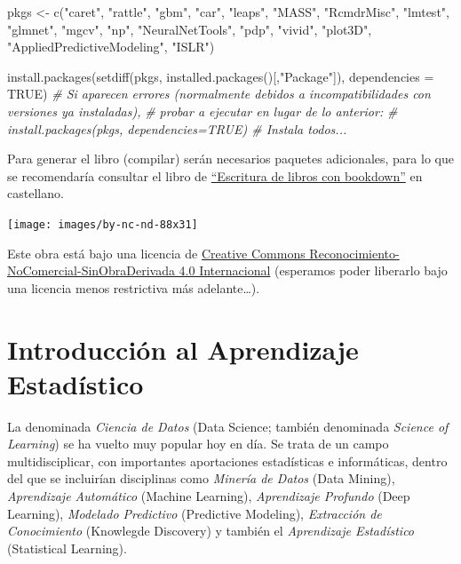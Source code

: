 \documentclass[
  spanish,
]{book}
\newenvironment{Shaded}{\begin{snugshade}}{\end{snugshade}}
\newcommand{\AttributeTok}[1]{\textcolor[rgb]{0.77,0.63,0.00}{#1}}
\newcommand{\CommentTok}[1]{\textcolor[rgb]{0.56,0.35,0.01}{\textit{#1}}}
\newcommand{\ConstantTok}[1]{\textcolor[rgb]{0.00,0.00,0.00}{#1}}
\newcommand{\FunctionTok}[1]{\textcolor[rgb]{0.00,0.00,0.00}{#1}}
\newcommand{\NormalTok}[1]{#1}
\newcommand{\OtherTok}[1]{\textcolor[rgb]{0.56,0.35,0.01}{#1}}
\newcommand{\StringTok}[1]{\textcolor[rgb]{0.31,0.60,0.02}{#1}}
\theoremstyle{break}
\theoremstyle{definition}
\theoremstyle{definition}
\theoremstyle{definition}
\theoremstyle{definition}
\theoremstyle{remark}
\begin{document}
\begin{Shaded}
\begin{Highlighting}[]
\NormalTok{pkgs }\OtherTok{\textless{}{-}} \FunctionTok{c}\NormalTok{(}\StringTok{"caret"}\NormalTok{, }\StringTok{"rattle"}\NormalTok{, }\StringTok{"gbm"}\NormalTok{, }\StringTok{"car"}\NormalTok{, }\StringTok{"leaps"}\NormalTok{, }\StringTok{"MASS"}\NormalTok{, }\StringTok{"RcmdrMisc"}\NormalTok{, }
          \StringTok{"lmtest"}\NormalTok{, }\StringTok{"glmnet"}\NormalTok{, }\StringTok{"mgcv"}\NormalTok{, }\StringTok{"np"}\NormalTok{, }\StringTok{"NeuralNetTools"}\NormalTok{, }\StringTok{"pdp"}\NormalTok{, }\StringTok{"vivid"}\NormalTok{,}
          \StringTok{"plot3D"}\NormalTok{, }\StringTok{"AppliedPredictiveModeling"}\NormalTok{, }\StringTok{"ISLR"}\NormalTok{)}

\FunctionTok{install.packages}\NormalTok{(}\FunctionTok{setdiff}\NormalTok{(pkgs, }\FunctionTok{installed.packages}\NormalTok{()[,}\StringTok{"Package"}\NormalTok{]), }\AttributeTok{dependencies =} \ConstantTok{TRUE}\NormalTok{)}
\CommentTok{\# Si aparecen errores (normalmente debidos a incompatibilidades con versiones ya instaladas), }
\CommentTok{\# probar a ejecutar en lugar de lo anterior:}
\CommentTok{\# install.packages(pkgs, dependencies=TRUE) \# Instala todos...}
\end{Highlighting}
\end{Shaded}

Para generar el libro (compilar) serán necesarios paquetes adicionales,
para lo que se recomendaría consultar el libro de \href{https://rubenfcasal.github.io/bookdown_intro}{``Escritura de libros con bookdown''} en castellano.

\texttt{[image: images/by-nc-nd-88x31]}

Este obra está bajo una licencia de \href{https://creativecommons.org/licenses/by-nc-nd/4.0/deed.es_ES}{Creative Commons Reconocimiento-NoComercial-SinObraDerivada 4.0 Internacional}
(esperamos poder liberarlo bajo una licencia menos restrictiva más adelante\ldots).

\hypertarget{intro-AE}{%
\chapter{Introducción al Aprendizaje Estadístico}\label{intro-AE}}

La denominada \emph{Ciencia de Datos} (Data Science; también denominada \emph{Science of Learning}) se ha vuelto muy popular hoy en día.
Se trata de un campo multidisciplicar, con importantes aportaciones estadísticas e informáticas, dentro del que se incluirían disciplinas como \emph{Minería de Datos} (Data Mining), \emph{Aprendizaje Automático} (Machine Learning), \emph{Aprendizaje Profundo} (Deep Learning), \emph{Modelado Predictivo} (Predictive Modeling), \emph{Extracción de Conocimiento} (Knowlegde Discovery) y también el \emph{Aprendizaje Estadístico} (Statistical Learning).
\end{document}
